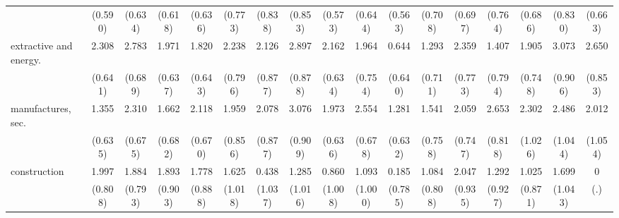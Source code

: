 {\begin{tabular}{l*{16}{c}}
                    &     (0.590)         &     (0.634)         &     (0.618)         &     (0.636)         &     (0.773)         &     (0.838)         &     (0.853)         &     (0.573)         &     (0.644)         &     (0.563)         &     (0.708)         &     (0.697)         &     (0.764)         &     (0.686)         &     (0.830)         &     (0.663)         \\
[1em]
extractive and energy.&       2.308\sym{***}&       2.783\sym{***}&       1.971\sym{**} &       1.820\sym{**} &       2.238\sym{**} &       2.126\sym{*}  &       2.897\sym{***}&       2.162\sym{***}&       1.964\sym{**} &       0.644         &       1.293         &       2.359\sym{**} &       1.407         &       1.905\sym{*}  &       3.073\sym{***}&       2.650\sym{**} \\
                    &     (0.641)         &     (0.689)         &     (0.637)         &     (0.643)         &     (0.796)         &     (0.877)         &     (0.878)         &     (0.634)         &     (0.754)         &     (0.640)         &     (0.711)         &     (0.773)         &     (0.794)         &     (0.748)         &     (0.906)         &     (0.853)         \\
[1em]
manufactures, sec.  &       1.355\sym{*}  &       2.310\sym{***}&       1.662\sym{*}  &       2.118\sym{**} &       1.959\sym{*}  &       2.078\sym{*}  &       3.076\sym{***}&       1.973\sym{**} &       2.554\sym{***}&       1.281\sym{*}  &       1.541\sym{*}  &       2.059\sym{**} &       2.653\sym{**} &       2.302\sym{*}  &       2.486\sym{*}  &       2.012         \\
                    &     (0.635)         &     (0.675)         &     (0.682)         &     (0.670)         &     (0.856)         &     (0.877)         &     (0.909)         &     (0.636)         &     (0.678)         &     (0.632)         &     (0.758)         &     (0.747)         &     (0.818)         &     (1.026)         &     (1.044)         &     (1.054)         \\
[1em]
construction        &       1.997\sym{*}  &       1.884\sym{*}  &       1.893\sym{*}  &       1.778\sym{*}  &       1.625         &       0.438         &       1.285         &       0.860         &       1.093         &       0.185         &       1.084         &       2.047\sym{*}  &       1.292         &       1.025         &       1.699         &           0         \\
                    &     (0.808)         &     (0.793)         &     (0.903)         &     (0.888)         &     (1.018)         &     (1.037)         &     (1.016)         &     (1.008)         &     (1.000)         &     (0.785)         &     (0.808)         &     (0.935)         &     (0.927)         &     (0.871)         &     (1.043)         &         (.)         \\

\end{tabular}}
